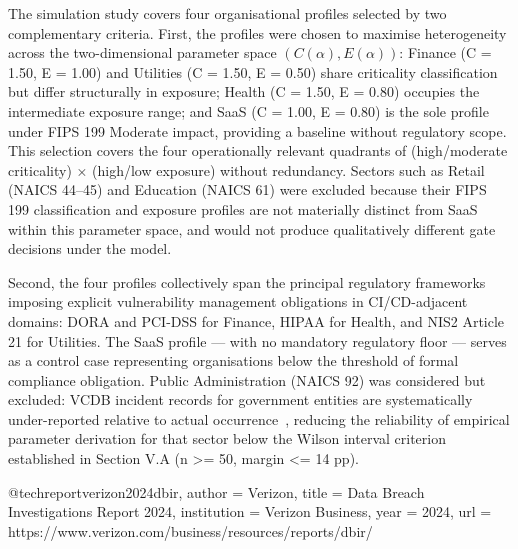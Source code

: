 
The simulation study covers four organisational profiles selected by two complementary criteria. First, the profiles were chosen to maximise heterogeneity across the two-dimensional parameter space $(C(\alpha), E(\alpha))$: Finance (C = 1.50, E = 1.00) and Utilities (C = 1.50, E = 0.50) share criticality classification but differ structurally in exposure; Health (C = 1.50, E = 0.80) occupies the intermediate exposure range; and SaaS (C = 1.00, E = 0.80) is the sole profile under FIPS 199 Moderate impact, providing a baseline without regulatory scope. This selection covers the four operationally relevant quadrants of (high/moderate criticality) × (high/low exposure) without redundancy. Sectors such as Retail (NAICS 44–45) and Education (NAICS 61) were excluded because their FIPS 199 classification and exposure profiles are not materially distinct from SaaS within this parameter space, and would not produce qualitatively different gate decisions under the model.

Second, the four profiles collectively span the principal regulatory frameworks imposing explicit vulnerability management obligations in CI/CD-adjacent domains: DORA and PCI-DSS for Finance, HIPAA for Health, and NIS2 Article 21 for Utilities. The SaaS profile — with no mandatory regulatory floor — serves as a control case representing organisations below the threshold of formal compliance obligation. Public Administration (NAICS 92) was considered but excluded: VCDB incident records for government entities are systematically under-reported relative to actual occurrence~\cite{verizon2024dbir}, reducing the reliability of empirical parameter derivation for that sector below the Wilson interval criterion established in Section V.A (n >= 50, margin <= 14 pp).

@techreport{verizon2024dbir,
  author      = {{Verizon}},
  title       = {Data Breach Investigations Report 2024},
  institution = {Verizon Business},
  year        = {2024},
  url         = {https://www.verizon.com/business/resources/reports/dbir/}
}
